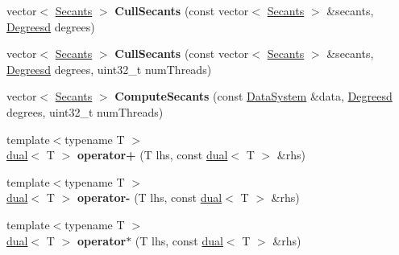 \begin{DoxyCompactItemize}
\item 
\hypertarget{namespace_d_r_d_s_p_a854bf76936468e08ba54d62d6f2881c4}{vector$<$ \hyperlink{struct_d_r_d_s_p_1_1_secants}{Secants} $>$ {\bfseries Cull\-Secants} (const vector$<$ \hyperlink{struct_d_r_d_s_p_1_1_secants}{Secants} $>$ \&secants, \hyperlink{struct_d_r_d_s_p_1_1_degrees}{Degreesd} degrees)}\label{namespace_d_r_d_s_p_a854bf76936468e08ba54d62d6f2881c4}

\item 
\hypertarget{namespace_d_r_d_s_p_a41194545b2e535c0cb29f117f894df46}{vector$<$ \hyperlink{struct_d_r_d_s_p_1_1_secants}{Secants} $>$ {\bfseries Cull\-Secants} (const vector$<$ \hyperlink{struct_d_r_d_s_p_1_1_secants}{Secants} $>$ \&secants, \hyperlink{struct_d_r_d_s_p_1_1_degrees}{Degreesd} degrees, uint32\-\_\-t num\-Threads)}\label{namespace_d_r_d_s_p_a41194545b2e535c0cb29f117f894df46}

\item 
\hypertarget{namespace_d_r_d_s_p_a662a111fcbcac315ab1328f24e649244}{vector$<$ \hyperlink{struct_d_r_d_s_p_1_1_secants}{Secants} $>$ {\bfseries Compute\-Secants} (const \hyperlink{struct_d_r_d_s_p_1_1_data_system}{Data\-System} \&data, \hyperlink{struct_d_r_d_s_p_1_1_degrees}{Degreesd} degrees, uint32\-\_\-t num\-Threads)}\label{namespace_d_r_d_s_p_a662a111fcbcac315ab1328f24e649244}

\item 
\hypertarget{namespace_d_r_d_s_p_a41e212998eec3d5560efd1ab35f6bea6}{{\footnotesize template$<$typename T $>$ }\\\hyperlink{struct_d_r_d_s_p_1_1dual}{dual}$<$ T $>$ {\bfseries operator+} (T lhs, const \hyperlink{struct_d_r_d_s_p_1_1dual}{dual}$<$ T $>$ \&rhs)}\label{namespace_d_r_d_s_p_a41e212998eec3d5560efd1ab35f6bea6}

\item 
\hypertarget{namespace_d_r_d_s_p_a84c69656b8267d0386e5d08c6deea1c0}{{\footnotesize template$<$typename T $>$ }\\\hyperlink{struct_d_r_d_s_p_1_1dual}{dual}$<$ T $>$ {\bfseries operator-\/} (T lhs, const \hyperlink{struct_d_r_d_s_p_1_1dual}{dual}$<$ T $>$ \&rhs)}\label{namespace_d_r_d_s_p_a84c69656b8267d0386e5d08c6deea1c0}

\item 
\hypertarget{namespace_d_r_d_s_p_a0828787e24d56a8afb23be5c5d0f2a43}{{\footnotesize template$<$typename T $>$ }\\\hyperlink{struct_d_r_d_s_p_1_1dual}{dual}$<$ T $>$ {\bfseries operator$\ast$} (T lhs, const \hyperlink{struct_d_r_d_s_p_1_1dual}{dual}$<$ T $>$ \&rhs)}\label{namespace_d_r_d_s_p_a0828787e24d56a8afb23be5c5d0f2a43}


\end{DoxyCompactItemize}
